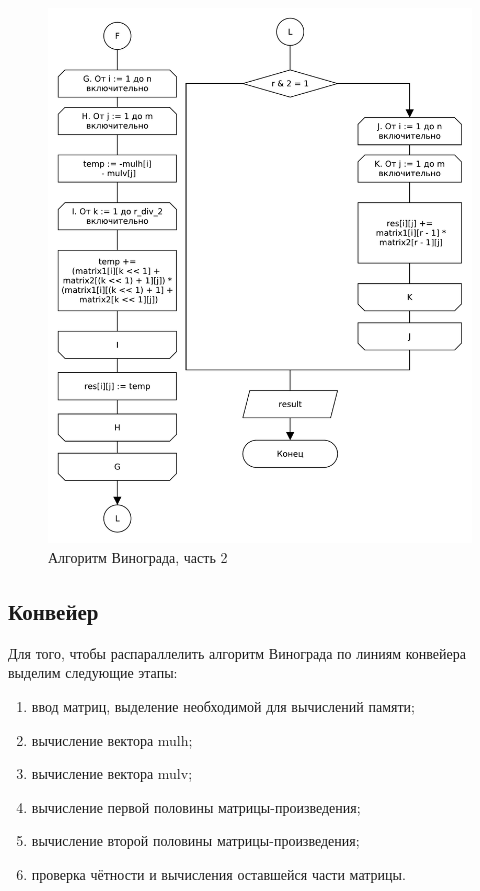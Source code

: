 \begin{figure}[H]
    \centering
    \includegraphics[scale=0.70]{pdf/owinograd-part2.pdf}
    \caption{Алгоритм Винограда, часть 2}
    \label{img:windograd2}
\end{figure}

\subsection{Конвейер}

Для того, чтобы распараллелить алгоритм Винограда по линиям конвейера выделим следующие этапы:
\begin{enumerate}
    \item ввод матриц, выделение необходимой для вычислений памяти;
    \item вычисление вектора mulh;
    \item вычисление вектора mulv;
    \item вычисление первой половины матрицы-произведения;
    \item вычисление второй половины матрицы-произведения;
    \item проверка чётности и вычисления оставшейся части матрицы.
\end{enumerate}

